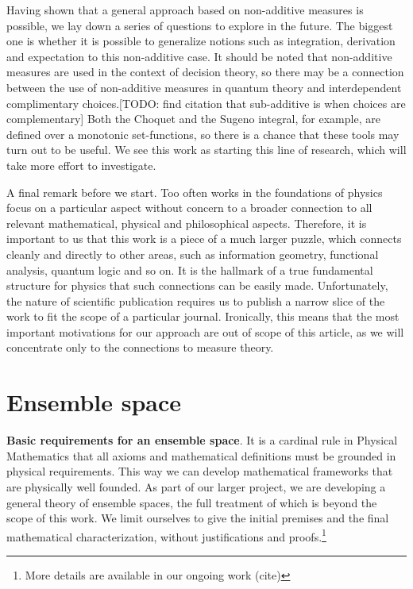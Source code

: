 \documentclass[10pt,twocolumn, nofootinbib]{revtex4-2}
\begin{document}
Having shown that a general approach based on non-additive measures is possible, we lay down a series of questions to explore in the future. The biggest one is whether it is possible to generalize notions such as integration, derivation and expectation to this non-additive case.  It should be noted that non-additive measures are used in the context of decision theory, so there may be a connection between the use of non-additive measures in quantum theory and interdependent complimentary choices.[TODO: find citation that sub-additive is when choices are complementary] Both the Choquet and the Sugeno integral, for example, are defined over a monotonic set-functions, so there is a chance that these tools may turn out to be useful. We see this work as starting this line of research, which will take more effort to investigate.

A final remark before we start. Too often works in the foundations of physics focus on a particular aspect without concern to a broader connection to all relevant mathematical, physical and philosophical aspects. Therefore, it is important to us that this work is a piece of a much larger puzzle, which connects cleanly and directly to  other areas, such as information geometry, functional analysis, quantum logic and so on. It is the hallmark of a true fundamental structure for physics that such connections can be easily made. Unfortunately, the nature of scientific publication requires us to publish a narrow slice of the work to fit the scope of a particular journal. Ironically, this means that the most important motivations for our approach are out of scope of this article, as we will concentrate only to the connections to measure theory.

\section{Ensemble space}

\textbf{Basic requirements for an ensemble space}. It is a cardinal rule in Physical Mathematics that all axioms and mathematical definitions must be grounded in physical requirements. This way we can develop mathematical frameworks that are physically well founded. As part of our larger project, we are developing a general theory of ensemble spaces, the full treatment of which is beyond the scope of this work. We limit ourselves to give the initial premises and the final mathematical characterization, without justifications and proofs.\footnote{More details are available in our ongoing work (cite)}
\end{document}

